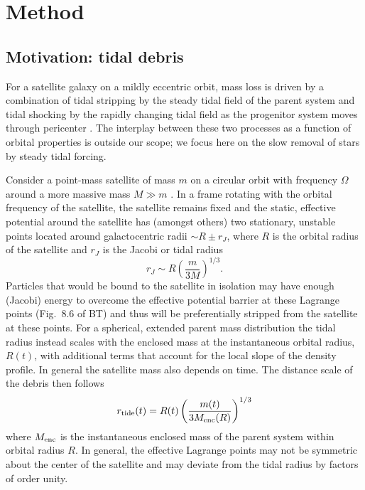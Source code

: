 \documentclass[letterpaper,12pt,preprint]{aastex}
\begin{document}
\section{Method}

\subsection{Motivation: tidal debris}\label{sec:debris}

For a satellite galaxy on a mildly eccentric orbit, mass loss is driven by a combination of tidal stripping by the steady tidal field of the parent system and tidal shocking by the rapidly changing tidal field as the progenitor system moves through pericenter \citep[e.g.,][]{choi09}. The interplay between these two processes as a function of orbital properties is outside our scope; we focus here on the slow removal of stars by steady tidal forcing. 

Consider a point-mass satellite of mass $m$ on a circular orbit with frequency $\Omega$ around a more massive mass $M\gg m$ \citep[the ``restricted three-body problem''; e.g., \S 8.3][]{binneytremaine}. In a frame rotating with the orbital frequency of the satellite, the satellite remains fixed and the static, effective potential around the satellite has (amongst others) two stationary, unstable points located around galactocentric radii $\sim R \pm r_J$, where $R$ is the orbital radius of the satellite and $r_J$ is the Jacobi or tidal radius
\begin{equation}
	r_J \sim R\left(\frac{m}{3M}\right)^{1/3}.\label{eq:ptmass}
\end{equation}
Particles that would be bound to the satellite in isolation may have enough (Jacobi) energy to overcome the effective potential barrier at these Lagrange points (Fig.~8.6 of BT) and thus will be preferentially stripped from the satellite at these points. For a spherical, extended parent mass distribution the tidal radius instead scales with the enclosed mass at the instantaneous orbital radius, $R(t)$, with additional terms that account for the local slope of the density profile. In general the satellite mass also depends on time. The distance scale of the debris then follows
\begin{equation}
	r_{\rm tide}(t) = R(t)\left(\frac{m(t)}{3M_{\rm enc}(R)}\right)^{1/3}\label{eq:tidalradius}
\end{equation}
where $M_{\rm enc}$ is the instantaneous enclosed mass of the parent system within orbital radius $R$.
In general, the effective Lagrange points may not be symmetric about the center of the satellite and may deviate from the tidal radius by factors of order unity. 
\end{document}
